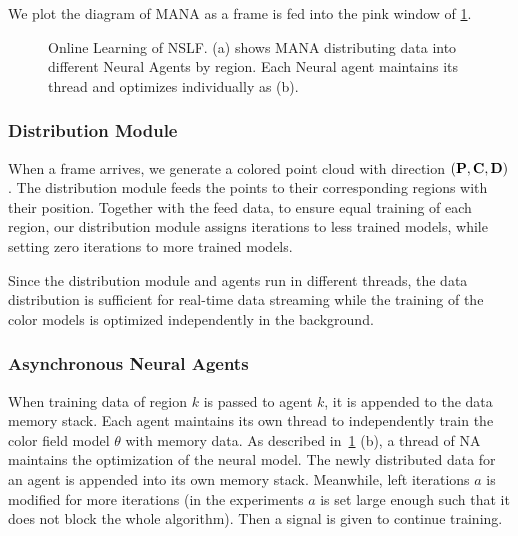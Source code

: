 We plot the diagram of MANA as a frame is fed into the pink window of \cref{fig:pipeline}.
\begin{figure}[t]
	\centering
	\caption{Online Learning of NSLF. 
		(a) shows MANA distributing data into different Neural Agents by region. Each Neural agent maintains its thread and optimizes individually as (b).}
	\vspace{-.6cm}
	\label{fig:pipeline}
\end{figure}
\subsubsection{Distribution Module}

When a frame arrives, we generate a colored point cloud with direction $(\mathbf P,\mathbf C, \mathbf D)$.
The distribution module feeds the points to their corresponding regions with their position. 
Together with the feed data, to ensure equal training of each region, our distribution module assigns iterations to less trained models, while setting zero iterations to more trained models. 

Since the distribution module and agents run in different threads,
the data distribution is sufficient for real-time data streaming while the training of the color models is optimized independently in the background.

\subsubsection{Asynchronous Neural Agents}

When training data of region $k$ is passed to agent $k$, it is appended to the data memory stack.
Each agent maintains its own thread to independently train the color field model $\theta$ with memory data.
As described in~\cref{fig:pipeline} (b), a thread of NA maintains the optimization of the neural model.
The newly distributed data for an agent is appended into its own memory stack. Meanwhile, left iterations {$a$} is modified for more iterations (in the experiments $a$ is set large enough such that it does not block the whole algorithm).
Then a signal is given to continue training.


